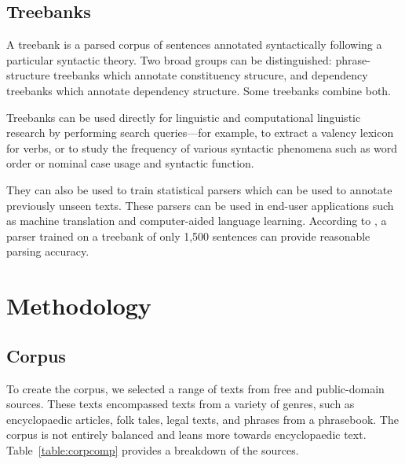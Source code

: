 \documentclass[a4paper,11pt, onecolumn,twoside]{article}
\begin{document}
\subsection{Treebanks} %

A treebank is a parsed corpus of sentences annotated syntactically following a particular
syntactic theory. Two broad groups can be distinguished: phrase-structure treebanks
which annotate constituency strucure, and dependency treebanks which annotate dependency
structure. Some treebanks combine both.

Treebanks can be used directly for linguistic and computational linguistic research by
performing search queries---for example, to extract a valency lexicon for verbs, or to study the frequency of various syntactic phenomena such as word order or nominal case usage
and syntactic function.

They can also be used to train statistical parsers which can
be used to annotate previously unseen texts. These parsers can be used in end-user applications
such as machine translation and computer-aided language learning.
According to \textcite{nivre08}, a parser trained on a treebank of only 1,500 sentences 
can provide reasonable parsing accuracy.


\section{Methodology}\label{sec:method}

\subsection{Corpus}

To create the corpus, we selected a range of texts from free and public-domain sources. These texts encompassed 
texts from a variety of genres, such as encyclopaedic articles, folk tales, legal texts, and phrases from a phrasebook.
The corpus is not entirely balanced and leans more towards encyclopaedic text. Table~\ref{table:corpcomp} provides
a breakdown of the sources.
\end{document}
